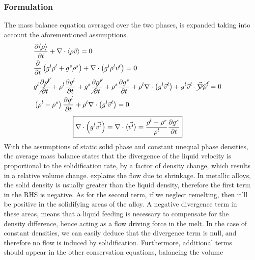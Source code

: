 \subsubsection{Formulation}
The mass balance equation averaged over the two phases, is expanded taking into account the aforementioned assumptions.
%
\begin{subequations}
\label{eq:shrinkage}
\begin{align}
& \frac{\partial \langle \rho \rangle}{\partial t} + \nabla \cdot \langle \rho \vec{v} \rangle  = 0 \\ 
& \frac{\partial }{\partial t} \left(  {g^l} \rho^l + {g^s} \rho^s \right) + \nabla \cdot \left(  {g^l} \rho^l \vec{v}^l \right) = 0 \\ 
& {g^l} \cancel{\frac{\partial \rho^l }{\partial t}} + \rho^l \frac{\partial  {g^l} }{\partial t} 
	+ {g^s} \cancel{\frac{\partial \rho^s }{\partial t}} + \rho^s \frac{\partial  {g^s} }{\partial t} 
	+ \rho^l \nabla \cdot \left(  {g^l} \vec{v}^l \right) 
	+ {g^l} \vec{v}^l \cdot  \cancel{ \vec{\nabla} \rho^l }	 = 0 \\
& \left(  \rho^l - \rho^s  \right) \frac{\partial  {g^l} }{\partial t} + \rho^l \nabla \cdot \left(  {g^l} \vec{v}^l \right)  = 0
\end{align}
\end{subequations}
%
\begin{align}
\label{eq:mass_balance_metal}
 \boxed{\nabla \cdot \left(  {g^l} \vec{v^l} \right) 
 	= \nabla \cdot \langle \vec{v^l} \rangle
 	= \frac{\rho^l-\rho^s}{\rho^l} \frac{\partial  {g^s} }{\partial t}}
\end{align}
%
With the assumptions of static solid phase and constant unequal phase densities, the average mass balance states that 
the divergence of the liquid velocity is proportional to the solidification rate, by a factor of density change, 
which results in a relative volume change.  explains the flow due to shrinkage. In metallic alloys, the solid density is
usually greater than the liquid density, therefore the first term in the RHS is negative. As for the second term, if we
neglect remelting, then it'll be positive in the solidifying areas of the alloy. A negative divergence term in these areas, 
means that a liquid feeding is necessary to compensate for the density difference, hence acting as a flow driving force in the melt.
In the case of constant densities, we can easily deduce that the divergence term is null, and therefore no flow is induced
by solidification. Furthermore, additional terms should appear in the other conservation equations, balancing the volume 
